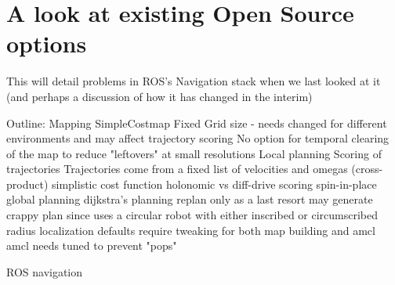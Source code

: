 \section{A look at existing Open Source options}

This will detail problems in ROS's Navigation stack when we last looked at it (and perhaps a discussion of how it has changed in the interim)

Outline:
	Mapping
		SimpleCostmap
		Fixed Grid size - needs changed for different environments and may affect trajectory scoring
		No option for temporal clearing of the map to reduce "leftovers" at small resolutions
	Local planning
		Scoring of trajectories
		Trajectories come from a fixed list of velocities and omegas (cross-product)
		simplistic cost function
		holonomic vs diff-drive
		scoring spin-in-place
	global planning
		dijkstra's planning
		replan only as a last resort
		may generate crappy plan since uses a circular robot with either inscribed or circumscribed radius
	localization
		defaults require tweaking for both map building and amcl
		amcl needs tuned to prevent "pops"
		


ROS navigation \autocite{Marder-Eppstein2010}
